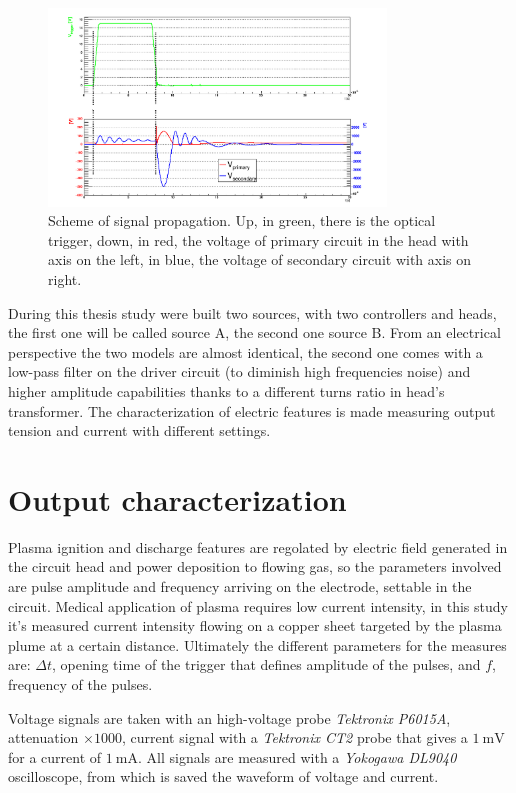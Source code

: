 \begin{figure}
 \centering
 \includegraphics[width=0.8\textwidth]{Images/Electric/segnali.png}
 \caption{Scheme of signal propagation. Up, in green, there is the optical trigger, down, in red, the voltage of primary circuit in the head with axis on the left, in blue, the voltage of secondary circuit with axis on right.}
 \label{fig:signals}
\end{figure}

During this thesis study were built two sources, with two controllers and heads, the first one will be called source A, the second one source B. From an electrical perspective the two models are almost identical, the second one comes with a low-pass filter on the driver circuit (to diminish high frequencies noise) and higher amplitude capabilities thanks to a different turns ratio in head's transformer.
The characterization of electric features is made measuring output tension and current with different settings.

\section{Output characterization}
Plasma ignition and discharge features are regolated by electric field generated in the circuit head and power deposition to flowing gas, so the parameters involved are pulse amplitude and frequency arriving on the electrode, settable in the circuit. Medical application of plasma requires low current intensity, in this study it's measured current intensity flowing on a copper sheet targeted by the plasma plume at a certain distance. Ultimately the different parameters for the measures are: $\Delta t$, opening time of the trigger that defines amplitude of the pulses, and $f$, frequency of the pulses. 

Voltage signals are taken with an high-voltage probe \emph{Tektronix P6015A}, attenuation $\times 1000$, current signal with a \emph{Tektronix CT2} probe that gives a $\SI{1}{\milli\volt}$ for a current of $\SI{1}{\milli\ampere}$. All signals are measured with a \emph{Yokogawa DL9040} oscilloscope, from which is saved the waveform of voltage and current.

